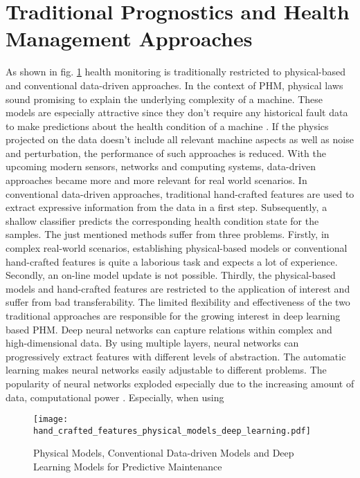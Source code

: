 \section{Traditional Prognostics and Health Management Approaches}
As shown in fig. \ref{fig:hand_crafted_features_physical_models_deep_learning} health monitoring is traditionally restricted to physical-based and conventional data-driven approaches. In the context of PHM, physical laws sound promising to explain the underlying complexity of a machine. These models are especially attractive since they don't require any historical fault data to make predictions about the health condition of a machine \cite{AN201942}. If the physics projected on the data doesn't include all relevant machine aspects as well as noise and perturbation, the performance of such approaches is reduced. With the upcoming modern sensors, networks and computing systems, data-driven approaches became more and more relevant for real world scenarios. In conventional data-driven approaches, traditional hand-crafted features are used to extract expressive information from the data in a first step. Subsequently, a shallow classifier predicts the corresponding health condition state for the samples. The just mentioned methods suffer from three problems. Firstly, in complex real-world scenarios, establishing physical-based models or conventional hand-crafted features is quite a laborious task and expects a lot of experience. Secondly, an on-line model update is not possible. Thirdly, the physical-based models and hand-crafted features are restricted to the application of interest and suffer from bad transferability. The limited flexibility and effectiveness of the two traditional approaches are responsible for the growing interest in deep learning based PHM. Deep neural networks can capture relations within complex and high-dimensional data. By using multiple layers, neural networks can progressively extract features with different levels of abstraction. The automatic learning makes neural networks easily adjustable to different problems. The popularity of neural networks exploded especially due to the increasing amount of data, computational power \cite{ZHAO2019213} \cite{AZAMFAR2020103932}. Especially, when using 

\begin{figure}[H]
  \centering
  \texttt{[image: hand\_crafted\_features\_physical\_models\_deep\_learning.pdf]}
  \caption {Physical Models, Conventional Data-driven Models and Deep Learning Models for Predictive Maintenance \cite{ZHAO2019213}} \label{fig:hand_crafted_features_physical_models_deep_learning}
\end{figure}